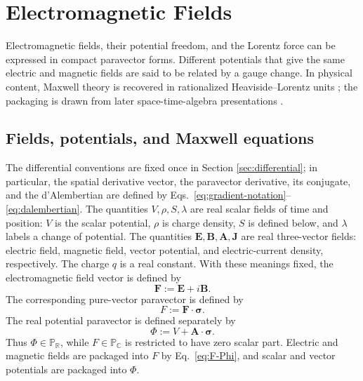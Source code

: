 \documentclass[10pt,letterpaper]{article}
\newcommand{\R}{\mathbb{R}}
\newcommand{\C}{\mathbb{C}}
\newcommand{\Pspace}{\mathbb{P}}
\newcommand{\RPspace}{\Pspace_{\R}}
\newcommand{\CPspace}{\Pspace_{\C}}
\newcommand{\pv}[1]{#1}
\newcommand{\vct}[1]{\mathbf{#1}}
\newcommand{\sigv}{\vct{\pv{\bm{\sigma}}}}
\begin{document}
\section{Electromagnetic Fields}\label{sec:em}
Electromagnetic fields, their potential freedom, and the Lorentz force can be
expressed in compact paravector forms. Different potentials that give the
same electric and magnetic fields are said to be related by a gauge change.
In physical content, Maxwell theory is recovered in rationalized
Heaviside--Lorentz units \cite{maxwell1865,jackson1998}; the packaging is
drawn from later space-time-algebra presentations
\cite{hestenes1966,baylis1999,doran2003}.

\subsection{Fields, potentials, and Maxwell equations}
The differential conventions are fixed once in Section
\ref{sec:differential}; in particular, the spatial derivative vector, the
paravector derivative, its conjugate, and the d'Alembertian are defined by
Eqs.\ \eqref{eq:gradient-notation}--\eqref{eq:dalembertian}. The quantities
\(V,\rho,S,\lambda\) are real scalar fields of time and position:
\(V\) is the scalar potential, \(\rho\) is charge density, \(S\) is defined
below, and \(\lambda\) labels a change of potential. The quantities
\(\vct{E},\vct{B},\vct{A},\vct{J}\) are real three-vector fields: electric
field, magnetic field, vector potential, and electric-current density,
respectively. The charge \(q\) is a real constant. With these meanings fixed,
the electromagnetic field vector is defined by
\begin{equation}
\vct{F}:=\vct{E}+i\vct{B}.
\label{eq:field-vector}
\end{equation}
The corresponding pure-vector paravector is defined by
\begin{equation}
\pv{F}:=\vct{F}\cdot\sigv.
\label{eq:F-Phi}
\end{equation}
The real potential paravector is defined separately by
\begin{equation}
\pv{\Phi}:=V+\vct{A}\cdot\sigv.
\label{eq:potential-paravector}
\end{equation}
Thus \(\pv{\Phi}\in\RPspace\), while
\(\pv{F}\in\CPspace\) is restricted to have zero scalar part. Electric and
magnetic fields are packaged into \(\pv{F}\) by Eq.\ \eqref{eq:F-Phi}, and
scalar and vector potentials are packaged into \(\pv{\Phi}\).
\end{document}
